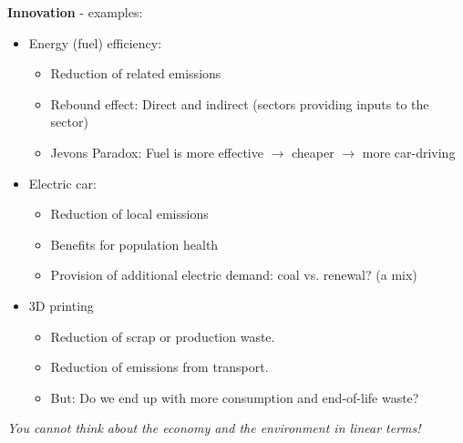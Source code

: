 \begin{multicols}{2}\noindent
 \textbf{Innovation} - examples:
 \begin{itemize}
  \item Energy (fuel) efficiency:
        \begin{itemize}
         \item Reduction of related emissions
         \item Rebound effect: Direct and indirect (sectors providing inputs to the sector)
         \item Jevons Paradox: Fuel is more effective $\rightarrow$ cheaper $\rightarrow$ more car-driving
        \end{itemize}
  \item Electric car:
        \begin{itemize}
         \item Reduction of local emissions
         \item Benefits for population health
         \item Provision of additional electric demand: coal vs. renewal? (a mix)
        \end{itemize}
  \item 3D printing
        \begin{itemize}
         \item Reduction of scrap or production waste.
         \item Reduction of emissions from transport.
         \item But: Do we end up with more consumption and end-of-life waste?
        \end{itemize}
 \end{itemize}
 \textit{You cannot think about the economy and the environment in linear terms!}
\end{multicols}

